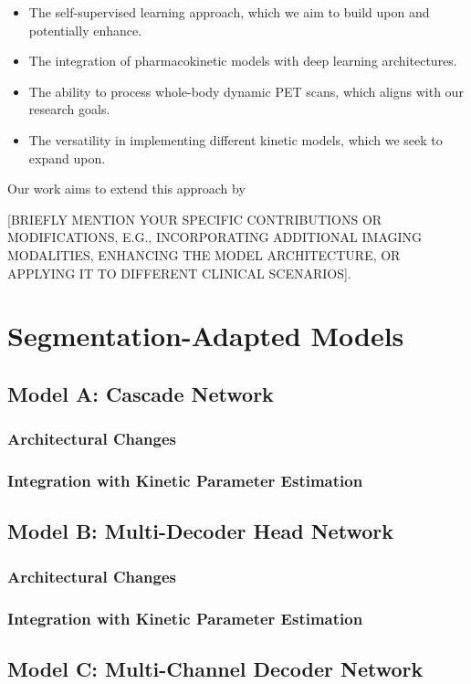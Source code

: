 \begin{itemize}
    \item The self-supervised learning approach, which we aim to build upon and potentially enhance.
    \item The integration of pharmacokinetic models with deep learning architectures.
    \item The ability to process whole-body dynamic PET scans, which aligns with our research goals.
    \item The versatility in implementing different kinetic models, which we seek to expand upon.
\end{itemize}

Our work aims to extend this approach by 

[BRIEFLY MENTION YOUR SPECIFIC CONTRIBUTIONS OR MODIFICATIONS, E.G., INCORPORATING ADDITIONAL IMAGING MODALITIES, ENHANCING THE MODEL ARCHITECTURE, OR APPLYING IT TO DIFFERENT CLINICAL SCENARIOS].

\section{Segmentation-Adapted Models}
\subsection{Model A: Cascade Network}
\subsubsection{Architectural Changes}
\subsubsection{Integration with Kinetic Parameter Estimation}

\subsection{Model B: Multi-Decoder Head Network}
\subsubsection{Architectural Changes}
\subsubsection{Integration with Kinetic Parameter Estimation}

\subsection{Model C: Multi-Channel Decoder Network}
